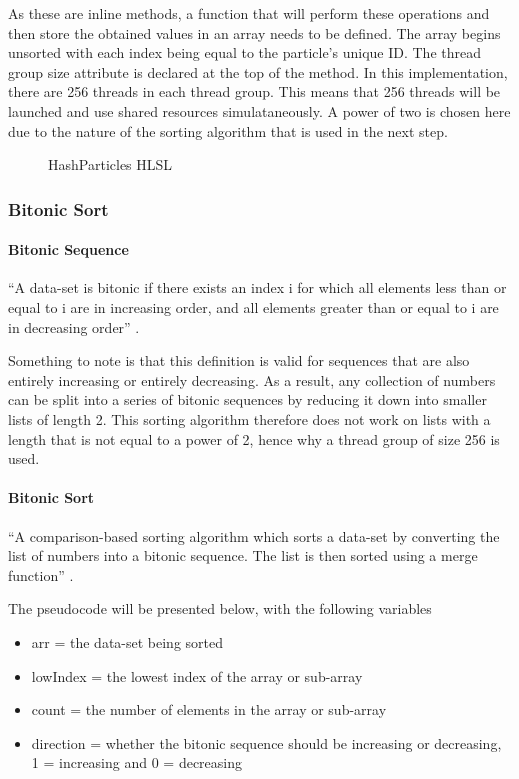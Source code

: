 \documentclass[12pt]{article}
\newcommand{\wideimage}[2][]{%
  \makebox[\textwidth][c]{\texttt{[image: \#2]}}%
}
\begin{document}
    As these are inline methods, a function that will perform these operations and then store the obtained values in an array needs to be defined. The array begins unsorted with each index being equal to the particle's unique ID. The thread group size attribute is declared at the top of the method. In this implementation, there are 256 threads in each thread group. This means that 256 threads will be launched and use shared resources simulataneously. A power of two is chosen here due to the nature of the sorting algorithm that is used in the next step.

    \begin{figure}[H]
        \begin{center}
            \wideimage[]{hashParticles.png}
            \caption{HashParticles HLSL}
        \end{center}
    \end{figure}

    \subsubsection{Bitonic Sort}
    
    \paragraph{Bitonic Sequence} ``A data-set is bitonic if there exists an index i for which all elements less than or equal to i are in increasing order, and all elements greater than or equal to i are in decreasing order'' \cite{bitonicyt}.

    Something to note is that this definition is valid for sequences that are also entirely increasing or entirely decreasing. As a result, any collection of numbers can be split into a series of bitonic sequences by reducing it down into smaller lists of length 2. This sorting algorithm therefore does not work on lists with a length that is not equal to a power of 2, hence why a thread group of size 256 is used.

    \paragraph{Bitonic Sort} ``A comparison-based sorting algorithm which sorts a data-set by converting the list of numbers into a bitonic sequence. The list is then sorted using a merge function'' \cite{bitonicyt}.

    The pseudocode will be presented below, with the following variables
    \begin{itemize}
        \item arr = the data-set being sorted
        \item lowIndex = the lowest index of the array or sub-array
        \item count = the number of elements in the array or sub-array
        \item direction = whether the bitonic sequence should be increasing or decreasing, 1 = increasing and 0 = decreasing
    \end{itemize}
\end{document}
